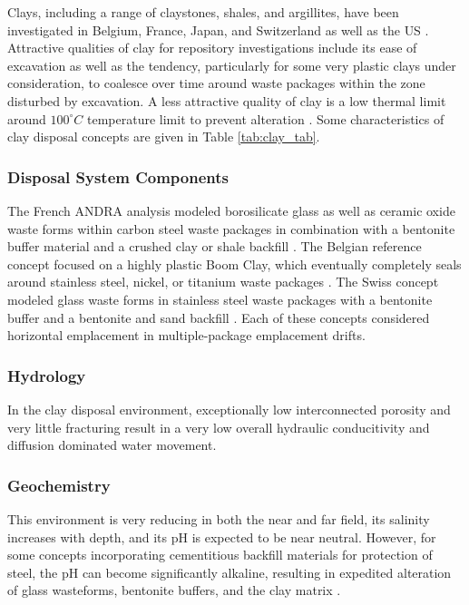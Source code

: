 Clays, including a range of claystones, shales, and argillites, have been 
investigated in Belgium, France, Japan, and Switzerland 
\cite{von_lensa_red-impact_2008} as well as the  \gls{US} 
\cite{clayton_generic_2011}. Attractive qualities 
of clay for repository investigations include its ease of excavation as well as
the tendency, particularly for some very plastic clays under consideration, to 
coalesce over time around waste packages within the zone disturbed by 
excavation.  A less attractive quality of clay is a 
low thermal limit around $100^{\circ}C$ temperature limit to prevent alteration 
\cite{hardin_generic_2011}.
Some characteristics of clay disposal 
concepts are given in Table \ref{tab:clay_tab}.   



\subsubsection{Disposal System Components}

The French \gls{ANDRA}  analysis modeled borosilicate glass as well as ceramic 
oxide waste forms within carbon steel waste packages in combination with a bentonite 
buffer material and a crushed clay or shale backfill \cite{andra_argile:_2005}.
The Belgian reference concept focused on a highly plastic Boom Clay, which 
eventually completely seals around stainless steel, nickel, or titanium waste 
packages \cite{ondraf-niras_technical_2001}.  The Swiss concept modeled glass 
waste forms in stainless steel waste packages with a bentonite buffer and a 
bentonite and sand backfill
\cite{johnson_calculations_2002}. Each of these concepts considered 
horizontal emplacement in multiple-package emplacement drifts. 


\subsubsection{Hydrology}

In the clay disposal environment, exceptionally low interconnected porosity and 
very little fracturing result in a very low overall hydraulic conducitivity and 
diffusion dominated water movement. 

\subsubsection{Geochemistry}

This environment is very reducing in both the near and far field, its salinity 
increases with depth, and its pH is expected to be near neutral. However, for 
some concepts incorporating cementitious backfill materials for protection 
of steel, the pH can become significantly alkaline, resulting in 
expedited alteration of glass wasteforms, bentonite buffers, and the clay 
matrix \cite{andra_argile:_2005}.


